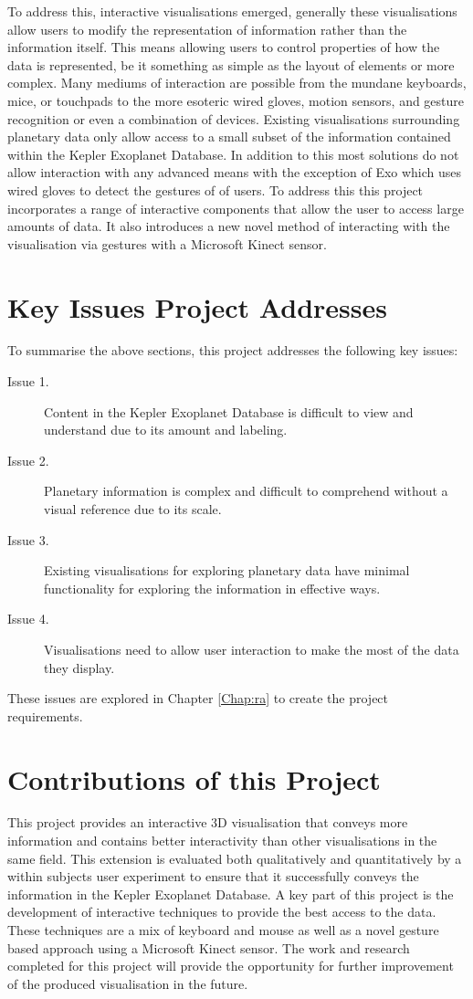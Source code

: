 To address
this, interactive visualisations emerged, generally these visualisations allow
users to modify the representation of information rather than the information
itself. This means allowing users to control properties of how the data is
represented, be it something as simple as the layout of elements or
more complex. Many mediums of interaction are possible from the mundane
keyboards, mice, or touchpads to the more esoteric wired gloves, motion sensors,
and gesture recognition or even a combination of devices. Existing
visualisations surrounding planetary data only allow access to a small subset of
the information contained within the Kepler Exoplanet Database. In addition to
this most solutions do not allow interaction with any advanced means with the
exception of Exo \cite{exo} which uses wired gloves to detect the gestures of of
users. To address this this project incorporates a range of interactive
components that allow the user to access large amounts of data. It also
introduces a new novel method of interacting with the visualisation via gestures
with a Microsoft Kinect sensor.

\section{Key Issues Project Addresses}
To summarise the above sections, this project addresses the following key
issues:
\begin{description}
 \item[Issue 1.] Content in the Kepler Exoplanet Database is difficult to view
and
understand due to its amount and labeling.
 \item[Issue 2.] Planetary information is complex and difficult to comprehend
without
a visual reference due to its scale.
 \item[Issue 3.] Existing visualisations for exploring planetary data have
minimal
functionality for exploring the information in effective ways.
 \item[Issue 4.] Visualisations need to allow user interaction to make the most
of
the data they display.
\end{description}
These issues are explored in Chapter \ref{Chap:ra} to create
the project requirements.

\section{Contributions of this Project}
This project provides an interactive 3D visualisation that conveys more information and
contains better interactivity than other visualisations in the same field. This
extension is evaluated both qualitatively and quantitatively by a within subjects user experiment to ensure that it
successfully conveys the information in the Kepler Exoplanet Database.
A key part of this project is the development of interactive techniques to provide the best access to the data. These techniques are a mix of keyboard and
mouse as well as a novel gesture based approach using a Microsoft Kinect sensor.
The work and research completed for this project will provide the opportunity
for further improvement of the produced visualisation in the future.
